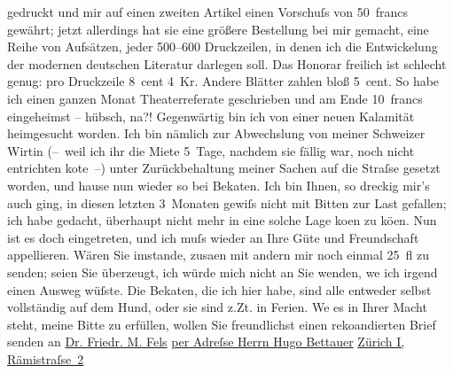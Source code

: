 \begin{ledgroupsized}[t]{13cm}
                    gedruckt und mir auf einen zweiten Artikel einen Vorschuſs von 50 francs
                    gewährt; jetzt allerdings hat sie eine größere Bestellung bei mir gemacht, eine
                    Reihe von Aufsätzen, jeder 500–600 Druckzeilen, in denen ich die Entwickelung
                    der modernen deutschen Literatur darlegen soll. Das Honorar freilich ist
                    schlecht genug: pro Druckzeile 8 cent 4 Kr. Andere Blätter zahlen bloß 5 cent.
                    So habe ich einen ganzen Monat Theaterreferate geschrieben und am Ende 10 francs
                    eingeheimst – hübsch, na?!\pend
           \pstart
           {\pb}Gegenwärtig bin ich von einer neuen Kalamität
                    heimgesucht worden. Ich bin nämlich zur Abwechslung von meiner Schweizer Wirtin (– weil ich ihr die Miete 5 Tage, nachdem sie fällig war, noch
                    nicht entrichten ko{\geminationn}te –) unter Zurückbehaltung
                    meiner Sachen auf die Straſse gesetzt worden, und hause nun wieder so bei Beka{\geminationn}ten. Ich bin Ihnen, so dreckig mir’s auch ging,
                    in diesen letzten 3 Monaten gewiſs nicht mit Bitten zur Last gefallen; ich habe
                    gedacht, überhaupt nicht mehr in eine solche Lage ko{\geminationm}en zu kö{\geminationn}en. Nun ist es doch eingetreten, und ich
                    muſs wieder an Ihre Güte und Freundschaft appellieren. Wären Sie imstande,
                        zusa{\geminationm}en mit andern mir noch einmal 25 fl zu
                    senden; seien Sie überzeugt, ich würde mich nicht an Sie wenden, we{\geminationn} ich irgend einen Ausweg wüſste. Die Beka{\geminationn}ten, die ich hier habe, sind alle entweder selbst
                    vollständig auf dem Hund, oder sie sind z.Zt. in Ferien. We{\geminationn} es in Ihrer Macht steht, meine Bitte zu
                    erfüllen, wollen Sie freundlichst einen reko{\geminationm}andierten Brief senden an\pend
           \pstart
           \centering{}\uline{Dr. Friedr. M. Fels}\pend
           \pstart
           \noindent{}\centering{}\uline{per Adreſse Herrn Hugo
                            Bettauer}\pend
           \pstart
           \noindent{}\raggedleft{}\uline{Zürich I, Rämistraſse 2}\pend

\end{ledgroupsized}
